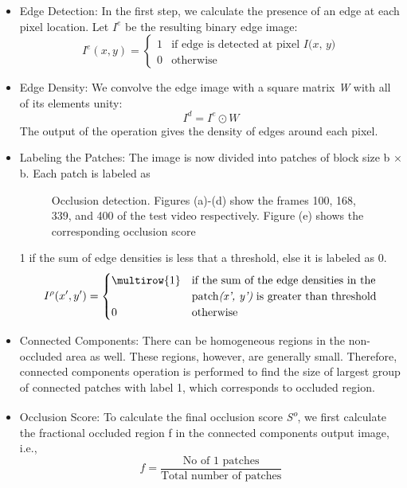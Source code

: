 \documentclass{sig-alternate}
\begin{document}
\begin{itemize}
\item Edge Detection: In the first step, we calculate the presence of an edge at each pixel location. Let $I^e$ be the resulting binary edge image:
\begin{equation}
    I^e(x,y)=
    \begin{cases}
      1& \text{if edge is detected at pixel } \textit{I(x, y)} \\
      0& \text{otherwise}
    \end{cases}
\end{equation}
\item Edge Density: We convolve the edge image with a square matrix \textit{W} with all of its elements unity:
\begin{equation}
    I^d=I^e\odot W
\end{equation}
The output of the operation gives the density of edges around
each pixel.
\item Labeling the Patches: The image is now divided into patches
of block size b × b. Each patch is labeled as
\begin{figure}
\centering
{}
\caption{Occlusion detection. Figures (a)-(d) show the frames
100, 168, 339, and 400 of the test video respectively. Figure (e) shows the corresponding occlusion score}
\end{figure}
1 if the sum of
edge densities is less that a threshold, else it is labeled as 0.
\begin{equation}
    I^\rho(x',y')=
    \begin{cases}
      \multirow{1} & \text{if the sum of the edge densities in the}\\
                               & \text{patch\textit{(x', y')} is greater than threshold}\\
      0& \text{otherwise}
    \end{cases}
\end{equation}
\item Connected Components: There can be homogeneous regions in the non-occluded area as well. These regions, however, are generally small. Therefore, connected components operation is performed to find the size of largest group of connected patches with label 1, which corresponds to occluded region.
\item Occlusion Score: To calculate the final occlusion score \textit{S\textsuperscript{o}},
we first calculate the fractional occluded region f in the connected
components output image, i.e.,
\begin{equation}
f=\frac{\text{No of 1 patches}}{\text{Total number of patches}}
\end{equation}
\end{itemize}
\end{document}
